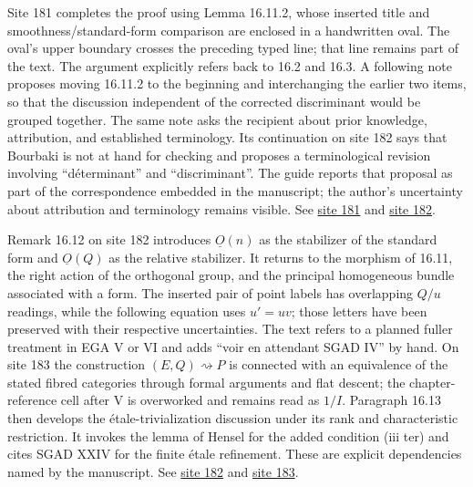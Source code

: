 \documentclass[10pt,a4paper]{article}
\begin{document}
Site 181 completes the proof using Lemma 16.11.2, whose inserted title and smoothness/standard-form comparison are enclosed in a handwritten oval. The oval's upper boundary crosses the preceding typed line; that line remains part of the text. The argument explicitly refers back to 16.2 and 16.3. A following note proposes moving 16.11.2 to the beginning and interchanging the earlier two items, so that the discussion independent of the corrected discriminant would be grouped together. The same note asks the recipient about prior knowledge, attribution, and established terminology. Its continuation on site 182 says that Bourbaki is not at hand for checking and proposes a terminological revision involving ``déterminant'' and ``discriminant''. The guide reports that proposal as part of the correspondence embedded in the manuscript; the author's uncertainty about attribution and terminology remains visible. See \href{https://grothendieck.umontpellier.fr/web/viewer.html?file=../25.pdf#page=182}{site 181} and \href{https://grothendieck.umontpellier.fr/web/viewer.html?file=../25.pdf#page=183}{site 182}.

Remark 16.12 on site 182 introduces \(\underline O(n)\) as the stabilizer of the standard form and \(\underline O(Q)\) as the relative stabilizer. It returns to the morphism of 16.11, the right action of the orthogonal group, and the principal homogeneous bundle associated with a form. The inserted pair of point labels has overlapping \(Q/u\) readings, while the following equation uses \(u'=uv\); those letters have been preserved with their respective uncertainties. The text refers to a planned fuller treatment in EGA V or VI and adds ``voir en attendant SGAD IV'' by hand. On site 183 the construction \((E,Q)\rightsquigarrow P\) is connected with an equivalence of the stated fibred categories through formal arguments and flat descent; the chapter-reference cell after V is overworked and remains read as \(1/I\). Paragraph 16.13 then develops the étale-trivialization discussion under its rank and characteristic restriction. It invokes the lemma of Hensel for the added condition (iii ter) and cites SGAD XXIV for the finite étale refinement. These are explicit dependencies named by the manuscript. See \href{https://grothendieck.umontpellier.fr/web/viewer.html?file=../25.pdf#page=183}{site 182} and \href{https://grothendieck.umontpellier.fr/web/viewer.html?file=../25.pdf#page=184}{site 183}.
\end{document}
